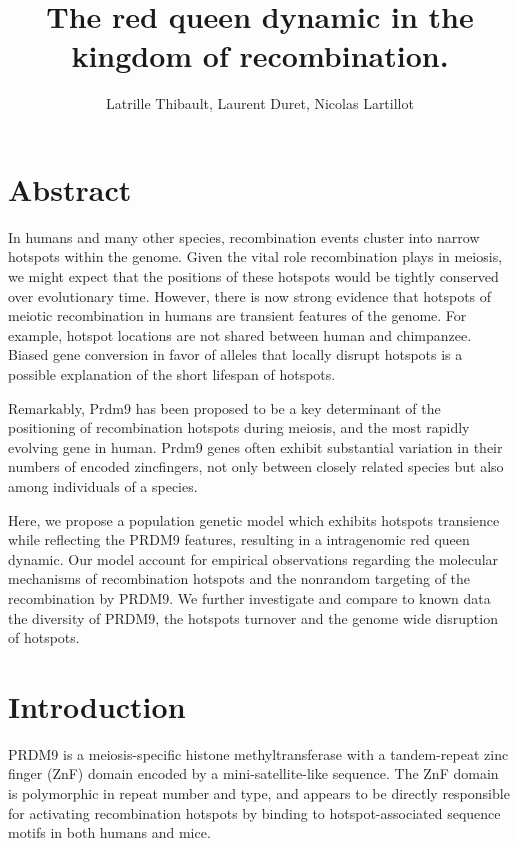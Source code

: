 \documentclass{article}
\author{Latrille Thibault, Laurent Duret, Nicolas Lartillot}
\title{The red queen dynamic in the kingdom of recombination.}
\begin{document}
\maketitle 


\section{Abstract}

In humans and many other species, recombination events cluster into narrow hotspots within the genome. Given the vital role recombination plays in meiosis, we might expect that the positions of these hotspots would be tightly conserved over evolutionary time. However, there is now strong evidence that hotspots of meiotic recombination in humans are transient features of the genome. For example, hotspot locations are not shared between human and chimpanzee. Biased gene conversion in favor of alleles that locally disrupt hotspots is a possible explanation of the short lifespan of hotspots.

Remarkably, Prdm9 has been proposed to be a key determinant of the positioning of recombination hotspots during meiosis, and the most rapidly evolving gene in human. Prdm9 genes often exhibit substantial variation in their numbers of encoded zincfingers, not only between closely related species but also among individuals of a species.

Here, we propose a population genetic model which exhibits hotspots transience while reflecting the PRDM9 features, resulting in a intragenomic red queen dynamic. Our model account for empirical observations regarding the molecular mechanisms of recombination hotspots and the nonrandom targeting of the recombination by PRDM9. We further investigate and compare to known data the diversity of PRDM9, the hotspots turnover and the genome wide disruption of hotspots.


\section{Introduction}

PRDM9 is a meiosis-specific histone methyltransferase with a tandem-repeat zinc finger (ZnF) domain encoded by a mini-satellite-like sequence. The ZnF domain is polymorphic in repeat number and type, and appears to be directly responsible for activating recombination hotspots by binding to hotspot-associated sequence motifs in both humans and mice.
\end{document}
